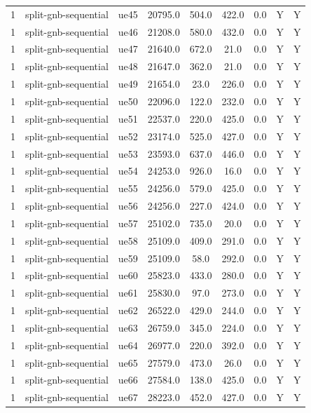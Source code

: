 \begin{table}[ht]
\begin{tabular}{|c|c|c|c|c|c|c|c|c|}
1 & split-gnb-sequential & ue45 & 20795.0 & 504.0 & 422.0 & 0.0 & Y & Y \\
1 & split-gnb-sequential & ue46 & 21208.0 & 580.0 & 432.0 & 0.0 & Y & Y \\
1 & split-gnb-sequential & ue47 & 21640.0 & 672.0 & 21.0 & 0.0 & Y & Y \\
1 & split-gnb-sequential & ue48 & 21647.0 & 362.0 & 21.0 & 0.0 & Y & Y \\
1 & split-gnb-sequential & ue49 & 21654.0 & 23.0 & 226.0 & 0.0 & Y & Y \\
1 & split-gnb-sequential & ue50 & 22096.0 & 122.0 & 232.0 & 0.0 & Y & Y \\
1 & split-gnb-sequential & ue51 & 22537.0 & 220.0 & 425.0 & 0.0 & Y & Y \\
1 & split-gnb-sequential & ue52 & 23174.0 & 525.0 & 427.0 & 0.0 & Y & Y \\
1 & split-gnb-sequential & ue53 & 23593.0 & 637.0 & 446.0 & 0.0 & Y & Y \\
1 & split-gnb-sequential & ue54 & 24253.0 & 926.0 & 16.0 & 0.0 & Y & Y \\
1 & split-gnb-sequential & ue55 & 24256.0 & 579.0 & 425.0 & 0.0 & Y & Y \\
1 & split-gnb-sequential & ue56 & 24256.0 & 227.0 & 424.0 & 0.0 & Y & Y \\
1 & split-gnb-sequential & ue57 & 25102.0 & 735.0 & 20.0 & 0.0 & Y & Y \\
1 & split-gnb-sequential & ue58 & 25109.0 & 409.0 & 291.0 & 0.0 & Y & Y \\
1 & split-gnb-sequential & ue59 & 25109.0 & 58.0 & 292.0 & 0.0 & Y & Y \\
1 & split-gnb-sequential & ue60 & 25823.0 & 433.0 & 280.0 & 0.0 & Y & Y \\
1 & split-gnb-sequential & ue61 & 25830.0 & 97.0 & 273.0 & 0.0 & Y & Y \\
1 & split-gnb-sequential & ue62 & 26522.0 & 429.0 & 244.0 & 0.0 & Y & Y \\
1 & split-gnb-sequential & ue63 & 26759.0 & 345.0 & 224.0 & 0.0 & Y & Y \\
1 & split-gnb-sequential & ue64 & 26977.0 & 220.0 & 392.0 & 0.0 & Y & Y \\
1 & split-gnb-sequential & ue65 & 27579.0 & 473.0 & 26.0 & 0.0 & Y & Y \\
1 & split-gnb-sequential & ue66 & 27584.0 & 138.0 & 425.0 & 0.0 & Y & Y \\
1 & split-gnb-sequential & ue67 & 28223.0 & 452.0 & 427.0 & 0.0 & Y & Y \\

\end{tabular}
\end{table}
